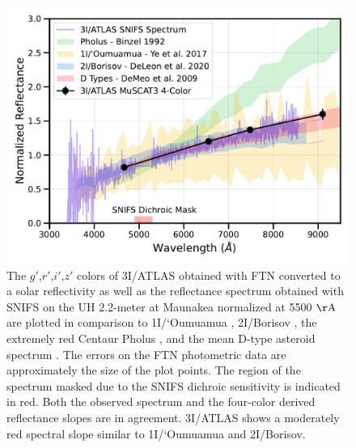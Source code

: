 \documentclass[linenumbers,twocolumn,longbib]{aastex7}
\begin{document}
\begin{figure}
\includegraphics[width=1.\linewidth]{figures/3I_color_comp_v3.pdf}
\caption{The $g'$,$r'$,$i'$,$z'$ colors of 3I/ATLAS obtained with FTN converted to a solar reflectivity as well as the reflectance spectrum obtained with SNIFS on the UH 2.2-meter at Maunakea normalized at 5500 $\mathrm{\AA}$ are plotted in comparison to 1I/`Oumuamua \citep{Ye2017}, 2I/Borisov \citep{deleon2020}, the extremely red Centaur Pholus \citep{Binzel1992}, and the mean D-type asteroid spectrum \citep{DeMeo2009}. The errors on the FTN photometric data are approximately the size of the plot points. The region of the spectrum masked due to the SNIFS dichroic sensitivity is indicated in red. Both the observed spectrum and the four-color derived reflectance slopes are in agreement. 3I/ATLAS shows a moderately red spectral slope similar to 1I/`Oumuamua and 2I/Borisov.}
\label{fig:3I_colors}
\end{figure}
\end{document}
